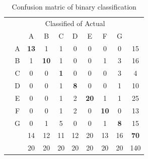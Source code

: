 {\begin{table}[H]
	\center
	\caption{Confusion matric of binary classification}\label{chap:eval_methods:tbl:multi_confusion}
	\begin{tabular}{c c c c c c c c c c}
		& & \multicolumn{7}{c}{Classified of Actual} & \\
		\cline{3-9}
		\multirow{9}{*}{\rotatebox[origin=c]{90}{Predicted}} & & \multicolumn{1}{|c}{A} & \multicolumn{1}{c}{B} & \multicolumn{1}{c}{C} & \multicolumn{1}{c}{D} & \multicolumn{1}{c}{E}  & \multicolumn{1}{c}{F} & \multicolumn{1}{c|}{G} & \\
		\cline{2-9}
		& \multicolumn{1}{|c}{A} & \multicolumn{1}{|c}{\textbf{13}} & \multicolumn{1}{c}{1} & \multicolumn{1}{c}{1} & \multicolumn{1}{c}{0} & \multicolumn{1}{c}{0} & \multicolumn{1}{c}{0} & \multicolumn{1}{c|}{0} & 15 \\
		& \multicolumn{1}{|c}{B} & \multicolumn{1}{|c}{1} & \multicolumn{1}{c}{\textbf{10}} & \multicolumn{1}{c}{1} & \multicolumn{1}{c}{0} & \multicolumn{1}{c}{0} & \multicolumn{1}{c}{1} & \multicolumn{1}{c|}{3} & 16 \\
		& \multicolumn{1}{|c}{C} & \multicolumn{1}{|c}{0} & \multicolumn{1}{c}{0} & \multicolumn{1}{c}{\textbf{1}} & \multicolumn{1}{c}{0} & \multicolumn{1}{c}{0} & \multicolumn{1}{c}{0} & \multicolumn{1}{c|}{3} & 4 \\
		& \multicolumn{1}{|c}{D} & \multicolumn{1}{|c}{0} & \multicolumn{1}{c}{0} & \multicolumn{1}{c}{1} & \multicolumn{1}{c}{\textbf{8}} & \multicolumn{1}{c}{0} & \multicolumn{1}{c}{0} & \multicolumn{1}{c|}{1} & 10 \\
		& \multicolumn{1}{|c}{E} & \multicolumn{1}{|c}{0} & \multicolumn{1}{c}{0} & \multicolumn{1}{c}{1} & \multicolumn{1}{c}{2} & \multicolumn{1}{c}{\textbf{20}} & \multicolumn{1}{c}{1} & \multicolumn{1}{c|}{1} & 25 \\
		& \multicolumn{1}{|c}{F} & \multicolumn{1}{|c}{0} & \multicolumn{1}{c}{0} & \multicolumn{1}{c}{1} & \multicolumn{1}{c}{2} & \multicolumn{1}{c}{0} & \multicolumn{1}{c}{\textbf{10}} & \multicolumn{1}{c|}{0} & 13 \\
		& \multicolumn{1}{|c}{G} & \multicolumn{1}{|c}{0} & \multicolumn{1}{c}{1} & \multicolumn{1}{c}{5} & \multicolumn{1}{c}{0} & \multicolumn{1}{c}{0} & \multicolumn{1}{c}{1} & \multicolumn{1}{c|}{\textbf{8}} & 15 \\
		\cline{2-9}
		&  & 14 & 12 & 11 & 12 & 20 & 13 & 16 & \textbf{70}\\
		\cline{2-10}
		&  & 20 & 20 & 20 & 20 & 20 & 20 & 20 & 140\\
	\end{tabular}
\end{table}


}
